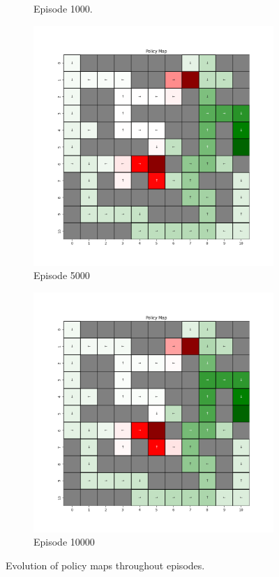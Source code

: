 \documentclass{assignment}
\begin{document}
\begin{figure}[H]
\begin{subfigure}{0.3\textwidth}
    \caption{Episode 1000.}
    \end{subfigure}\hfill
    \begin{subfigure}{0.3\textwidth}
        \includegraphics[width=\textwidth]{figures/policy_td/epsilon_sweep/policy_alpha_0.1_gamma_0.95_epsilon_0.0_iteration_5000.png}
    \caption{Episode 5000}
    \end{subfigure}\hfill
    \begin{subfigure}{0.3\textwidth}
        \includegraphics[width=\textwidth]{figures/policy_td/epsilon_sweep/policy_alpha_0.1_gamma_0.95_epsilon_0.0_iteration_10000.png}
    \caption{Episode 10000}
    \end{subfigure}
    \caption{Evolution of policy maps throughout episodes.}
    \label{fig:epsilon_0.0_td_learning_policy}
\end{figure}
\end{document}
